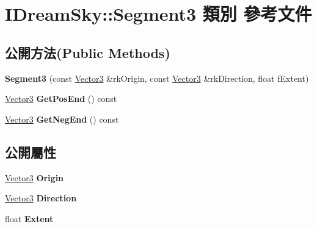 \hypertarget{class_i_dream_sky_1_1_segment3}{}\section{I\+Dream\+Sky\+:\+:Segment3 類別 參考文件}
\label{class_i_dream_sky_1_1_segment3}
\subsection*{公開方法(Public Methods)}
\begin{DoxyCompactItemize}
\item 
{\bfseries Segment3} (const \hyperlink{class_i_dream_sky_1_1_vector3}{Vector3} \&rk\+Origin, const \hyperlink{class_i_dream_sky_1_1_vector3}{Vector3} \&rk\+Direction, float f\+Extent)\hypertarget{class_i_dream_sky_1_1_segment3_a92573e18cb808aa83e5751d8fdb50a5c}{}\label{class_i_dream_sky_1_1_segment3_a92573e18cb808aa83e5751d8fdb50a5c}

\item 
\hyperlink{class_i_dream_sky_1_1_vector3}{Vector3} {\bfseries Get\+Pos\+End} () const \hypertarget{class_i_dream_sky_1_1_segment3_a8a28c9de603d14eb95a16ca69a80e63c}{}\label{class_i_dream_sky_1_1_segment3_a8a28c9de603d14eb95a16ca69a80e63c}

\item 
\hyperlink{class_i_dream_sky_1_1_vector3}{Vector3} {\bfseries Get\+Neg\+End} () const \hypertarget{class_i_dream_sky_1_1_segment3_ae756550fdf6407db62bb77564a2a8941}{}\label{class_i_dream_sky_1_1_segment3_ae756550fdf6407db62bb77564a2a8941}

\end{DoxyCompactItemize}
\subsection*{公開屬性}
\begin{DoxyCompactItemize}
\item 
\hyperlink{class_i_dream_sky_1_1_vector3}{Vector3} {\bfseries Origin}\hypertarget{class_i_dream_sky_1_1_segment3_acd1c686c2e10ab715717fa32729f00d3}{}\label{class_i_dream_sky_1_1_segment3_acd1c686c2e10ab715717fa32729f00d3}

\item 
\hyperlink{class_i_dream_sky_1_1_vector3}{Vector3} {\bfseries Direction}\hypertarget{class_i_dream_sky_1_1_segment3_a79c2116ee3af9a2bce10ae8fc7959c47}{}\label{class_i_dream_sky_1_1_segment3_a79c2116ee3af9a2bce10ae8fc7959c47}

\item 
float {\bfseries Extent}\hypertarget{class_i_dream_sky_1_1_segment3_a51f5328752f69a0e3d918a8c7ff8bccb}{}\label{class_i_dream_sky_1_1_segment3_a51f5328752f69a0e3d918a8c7ff8bccb}

\end{DoxyCompactItemize}


